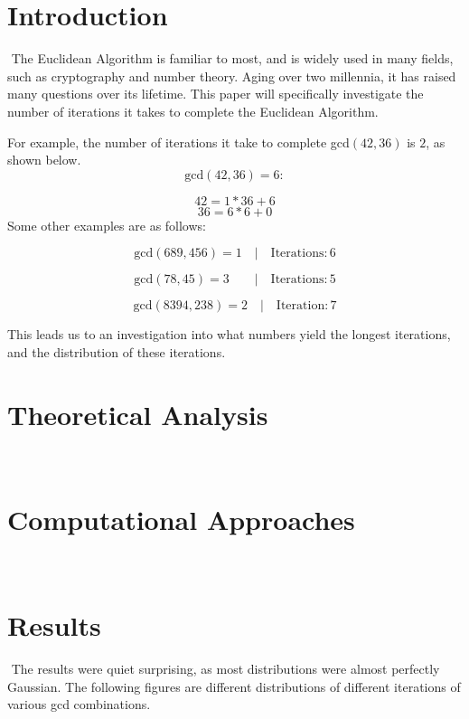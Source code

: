 \documentclass[11pt]{article}
\begin{document}
\tableofcontents
\newpage
\newpage

\section{Introduction}
$ $ \indent The Euclidean Algorithm is familiar to most, and is widely used in many fields, such as cryptography and number theory. Aging over two millennia, it has raised many questions over its lifetime. This paper will specifically investigate the number of iterations it takes to complete the Euclidean Algorithm. 

For example, the number of iterations it take to complete gcd$(42,36)$ is $2$, as shown below.
		$$\mathrm{gcd}(42,36) = 6:$$

	\begin{equation}
		42 = 1 * 36 + 6
	\end{equation}
	\begin{equation}
		36 = 6 * 6 + 0
	\end{equation}
Some other examples are as follows:

$$\mathrm{gcd}(689,456) = 1 \quad|\quad \mathrm{Iterations}: 6$$

$$\mathrm{gcd}(78,45) = 3 \quad\quad| \quad\mathrm{Iterations}: 5$$

$$\mathrm{gcd}(8394,238) = 2 \quad|\quad \mathrm{Iteration}: 7$$


This leads us to an investigation into what numbers yield the longest iterations, and the distribution of these iterations.


\section{Theoretical Analysis}$ $


\section{Computational Approaches}$ $



\section{Results}$ $	\indent The results were quiet surprising, as most distributions were almost perfectly Gaussian. The following figures are different distributions of different iterations of various gcd combinations.\\
	
\end{document}
